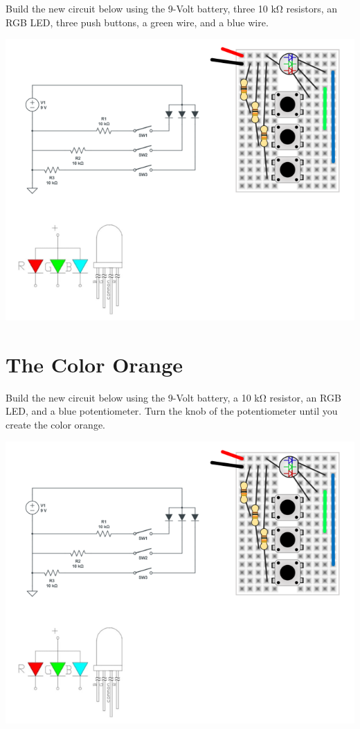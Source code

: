 \documentclass[
]{book}
\begin{document}
Build the new circuit below using the 9-Volt battery, three 10 kΩ resistors, an RGB LED, three push buttons, a green wire, and a blue wire.

\includegraphics[width=9.24in]{images/rgb_led_diagram}

\hypertarget{the-color-orange}{%
\chapter{The Color Orange}\label{the-color-orange}}

Build the new circuit below using the 9-Volt battery, a 10 kΩ resistor, an RGB LED, and a blue potentiometer. Turn the knob of the potentiometer until you create the color orange.

\includegraphics[width=9.24in]{images/rgb_led_diagram}
\end{document}
